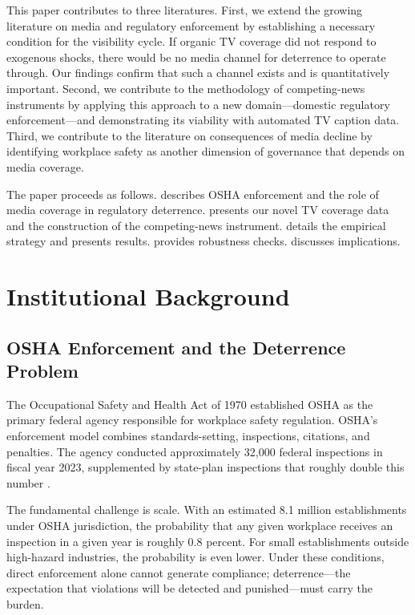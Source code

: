 \documentclass[12pt]{article}
\begin{document}
This paper contributes to three literatures. First, we extend the growing literature on media and regulatory enforcement \citep{Johnson2020, HeesePeterson2022, DyckMorseZingales2010, SnyderStromberg2010} by establishing a necessary condition for the visibility cycle. If organic TV coverage did not respond to exogenous shocks, there would be no media channel for deterrence to operate through. Our findings confirm that such a channel exists and is quantitatively important. Second, we contribute to the methodology of competing-news instruments \citep{EisenseeStromberg2007} by applying this approach to a new domain---domestic regulatory enforcement---and demonstrating its viability with automated TV caption data. Third, we contribute to the literature on consequences of media decline \citep{GaoLeeMurphy2020} by identifying workplace safety as another dimension of governance that depends on media coverage.

The paper proceeds as follows.  describes OSHA enforcement and the role of media coverage in regulatory deterrence.  presents our novel TV coverage data and the construction of the competing-news instrument.  details the empirical strategy and presents results.  provides robustness checks.  discusses implications.


\section{Institutional Background}\label{sec:background}

\subsection{OSHA Enforcement and the Deterrence Problem}

The Occupational Safety and Health Act of 1970 established OSHA as the primary federal agency responsible for workplace safety regulation. OSHA's enforcement model combines standards-setting, inspections, citations, and penalties. The agency conducted approximately 32,000 federal inspections in fiscal year 2023, supplemented by state-plan inspections that roughly double this number \citep{OSHADOI2023}.

The fundamental challenge is scale. With an estimated 8.1 million establishments under OSHA jurisdiction, the probability that any given workplace receives an inspection in a given year is roughly 0.8 percent. For small establishments outside high-hazard industries, the probability is even lower. Under these conditions, direct enforcement alone cannot generate compliance; deterrence---the expectation that violations will be detected and punished---must carry the burden.
\end{document}
